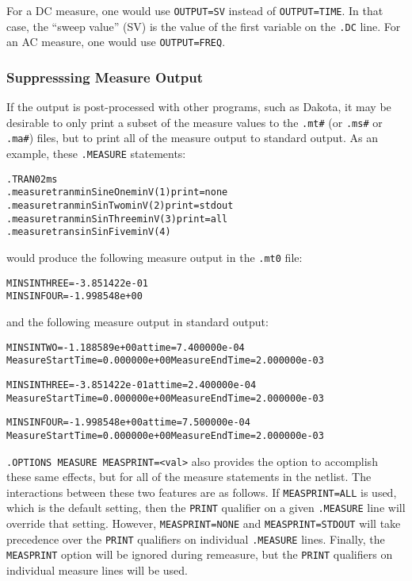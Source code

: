 For a DC measure, one would use \texttt{OUTPUT=SV} instead of \texttt{OUTPUT=TIME}.
In that case, the ``sweep value'' (SV) is the value of the first variable on the 
\texttt{.DC} line. For an AC measure, one would use \texttt{OUTPUT=FREQ}.

\subsubsection{Suppresssing Measure Output}
\label{Measure_Suppressing_Measure_Output}
If the \Xyce{} output is post-processed with other programs, such as Dakota, it
may be desirable to only print a subset of the measure values to the \texttt{.mt\#} (or \texttt{.ms\#}
or \texttt{.ma\#}) files, but to print all of the measure output to standard output.  As an example, 
these {\tt .MEASURE} statements:
\begin{alltt}
.TRAN 0  2ms
.measure tran minSineOne  min V(1) print=none
.measure tran minSinTwo   min V(2) print=stdout
.measure tran minSinThree min V(3) print=all
.measure tran sinSinFive  min V(4) 
\end{alltt}
would produce the following measure output in the {\tt .mt0} file:
\begin{alltt}
MINSINTHREE = -3.851422e-01
MINSINFOUR = -1.998548e+00
\end{alltt}
and the following measure output in standard output:
\begin{alltt}
MINSINTWO = -1.188589e+00 at time = 7.400000e-04
Measure Start Time= 0.000000e+00	Measure End Time= 2.000000e-03

MINSINTHREE = -3.851422e-01 at time = 2.400000e-04
Measure Start Time= 0.000000e+00	Measure End Time= 2.000000e-03

MINSINFOUR = -1.998548e+00 at time = 7.500000e-04
Measure Start Time= 0.000000e+00	Measure End Time= 2.000000e-03
\end{alltt}

\texttt{.OPTIONS MEASURE MEASPRINT=<val>} also provides the option to accomplish
these same effects, but for all of the measure statements in the netlist.  The
interactions between these two features are as follows.  If \texttt{MEASPRINT=ALL} 
is used, which is the default setting, then the \texttt{PRINT} qualifier on a given
\texttt{.MEASURE} line will override that setting.  However, \texttt{MEASPRINT=NONE}
and \texttt{MEASPRINT=STDOUT} will take precedence over the \texttt{PRINT} qualifiers 
on individual \texttt{.MEASURE} lines.  Finally, the \texttt{MEASPRINT} option will
be ignored during remeasure, but the \texttt{PRINT} qualifiers on individual 
measure lines will be used.

